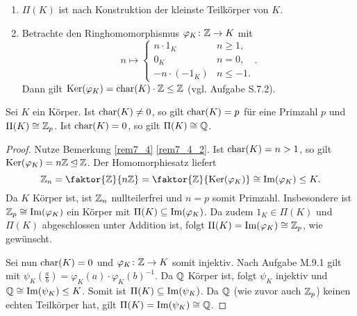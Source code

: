 \begin{rem}\label{rem7_4}
	\begin{enumerate}[label=(\roman*)]
		\item $\Pi(K)$ ist nach Konstruktion der kleinste Teilkörper von $K$. 
		\item\label{rem7_4_2} Betrachte den Ringhomomorphismus $\varphi_K \colon \mathbb{Z} \to K$ mit
		\[n \mapsto \begin{cases}
			n \cdot 1_K & n \geq 1,\\
			0_K & n = 0,\\
			-n \cdot (-1_K) & n \leq -1.
		\end{cases}.\]
		Dann gilt $\mathrm{Ker}(\varphi_K) = \mathrm{char}(K) \cdot \mathbb{Z} \leq \mathbb{Z}$ (vgl. Aufgabe S.7.2).
	\end{enumerate}
\end{rem}
\begin{satz}\label{satz7_5}
	Sei $K$ ein Körper. Ist $\mathrm{char}(K) \neq 0$, so gilt $\mathrm{char}(K) = p$ für eine Primzahl $p$ und $\Pi(K) \cong \mathbb{Z}_p$. Ist $\mathrm{char}(K) = 0$, so gilt $\Pi(K) \cong \mathbb{Q}$.
\end{satz}
\begin{proof}
	Nutze Bemerkung \ref{rem7_4} \ref{rem7_4_2}. Ist $\mathrm{char}(K) = n > 1$, so gilt $\mathrm{Ker}(\varphi_K) = n \mathbb{Z} \unlhd \mathbb{Z}$. Der Homomorphiesatz liefert 
	\[\Z_n = \faktor{\Z}{n \Z} = \faktor{\Z}{\ker(\varphi_K)} \cong \im(\varphi_K) \leq K.\]
	Da $K$ Körper ist, ist $\mathbb{Z}_n$ nullteilerfrei und $n = p$ somit Primzahl. Insbesondere ist $\mathbb{Z}_p \cong \mathrm{Im}(\varphi_K)$ ein Körper mit $\Pi(K) \subseteq \mathrm{Im}(\varphi_K)$. Da zudem $1_K \in \Pi(K)$ und $\Pi(K)$ abgeschlossen unter Addition ist, folgt $\Pi(K) = \mathrm{Im}(\varphi_K) \cong \mathbb{Z}_p$, wie gewünscht.
	
	Sei nun $\mathrm{char}(K) = 0$ und $\varphi_K \colon \mathbb{Z} \to K$ somit injektiv. Nach Aufgabe M.9.1 gilt 
	mit $\psi_K\left(\frac{a}{b}\right) = \varphi_K(a) \cdot \varphi_K(b)^{-1}$. Da $\mathbb{Q}$ Körper ist, folgt $\psi_K$ injektiv und $\mathbb{Q} \cong \mathrm{Im}(\psi_K) \leq K$. Somit ist $\Pi(K) \subseteq \mathrm{Im}(\psi_K)$. Da $\mathbb{Q}$ (wie zuvor auch $\mathbb{Z}_p$) keinen echten Teilkörper hat, gilt $\Pi(K) = \mathrm{Im}(\psi_K) \cong \mathbb{Q}$.
\end{proof}
